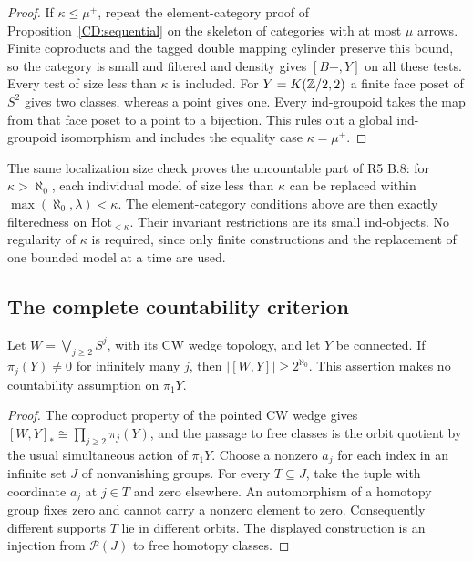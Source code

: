 \begin{proof}
If $\kappa\le\mu^+$, repeat the element-category proof of
Proposition~\ref{CD:sequential} on the skeleton of categories with
at most $\mu$ arrows.  Finite coproducts and the tagged double
mapping cylinder preserve this bound, so the category is small and
filtered and density gives $[B-,Y]$ on all these tests.  Every test
of size less than $\kappa$ is included.  For $Y=K(\mathbb Z/2,2)$ a finite
face poset of $S^2$ gives two classes, whereas a point gives one.
Every ind-groupoid takes the map from that face poset to a point
to a bijection.  This rules out a global ind-groupoid isomorphism
and includes the equality case $\kappa=\mu^+$.
\end{proof}

The same localization size check proves the uncountable part of R5 B.8:
for $\kappa>\aleph_0$, each individual model of size less than
$\kappa$ can be replaced within
$\max(\aleph_0,\lambda)<\kappa$.  The element-category conditions
above are then exactly filteredness on $\mathrm{Hot}_{<\kappa}$.
Their invariant restrictions are its small ind-objects.  No regularity
of $\kappa$ is required, since only finite constructions and the
replacement of one bounded model at a time are used.

\subsection{The complete countability criterion}

\begin{lemma}
\label{CD:wedgecriterion}
Let $W=\bigvee_{j\ge2}S^j$, with its CW wedge topology, and let $Y$
be connected.  If $\pi_j(Y)\ne0$ for infinitely many $j$, then
$|[W,Y]|\ge2^{\aleph_0}$.  This assertion makes no countability
assumption on $\pi_1Y$.
\end{lemma}
\begin{proof}
The coproduct property of the pointed CW wedge gives
$[W,Y]_*\cong\prod_{j\ge2}\pi_j(Y)$, and the passage to free classes
is the orbit quotient by the usual simultaneous action of $\pi_1Y$.
Choose a nonzero $a_j$ for each index in an infinite set $J$ of
nonvanishing groups.  For every $T\subseteq J$, take the tuple with
coordinate $a_j$ at $j\in T$ and zero elsewhere.  An automorphism of
a homotopy group fixes zero and cannot carry a nonzero element to zero.
Consequently different supports $T$ lie in different orbits.  The
displayed construction is an injection from $\mathcal P(J)$ to free
homotopy classes.
\end{proof}

